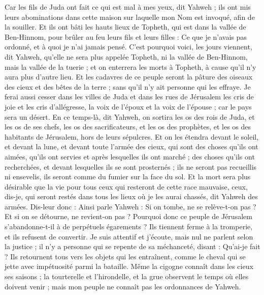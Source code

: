 \begin{multicols}{2}
Car les fils de Juda ont fait ce qui est mal à mes yeux, dit Yahweh ; ils ont mis leurs abominations dans cette maison sur laquelle mon Nom est invoqué, afin de la souiller.
Et ils ont bâti les hauts lieux de Topheth, qui est dans la vallée de Ben-Hinnom, pour brûler au feu leurs fils et leurs filles : Ce que je n'avais pas ordonné, et à quoi je n'ai jamais pensé.
C'est pourquoi voici, les jours viennent, dit Yahweh, qu'elle ne sera plus appelée Topheth, ni la vallée de Ben-Hinnom, mais la vallée de la tuerie ; et on enterrera les morts à Topheth, à cause qu'il n'y aura plus d'autre lieu.
Et les cadavres de ce peuple seront la pâture des oiseaux des cieux et des bêtes de la terre ; sans qu'il n'y ait personne qui les effraye.
Je ferai aussi cesser dans les villes de Juda et dans les rues de Jérusalem les cris de joie et les cris d'allégresse, la voix de l'époux et la voix de l'épouse ; car le pays sera un désert.
\VerseOne{}En ce temps-là, dit Yahweh, on sortira les os des rois de Juda, et les os de ses chefs, les os des sacrificateurs, et les os des prophètes, et les os des habitants de Jérusalem, hors de leurs sépulcres.
Et on les étendra devant le soleil, et devant la lune, et devant toute l'armée des cieux, qui sont des choses qu'ils ont aimées, qu'ils ont servies et après lesquelles ils ont marché ; des choses qu'ils ont recherchées, et devant lesquelles ils se sont prosternés ; ils ne seront pas recueillis ni ensevelis, ils seront comme du fumier sur la face du sol.
Et la mort sera plus désirable que la vie pour tous ceux qui resteront de cette race mauvaise, ceux, dis-je, qui seront restés dans tous les lieux où je les aurai chassés, dit Yahweh des armées.
Dis-leur donc : Ainsi parle Yahweh : Si on tombe, ne se relève-t-on pas ? Et si on se détourne, ne revient-on pas ?
Pourquoi donc ce peuple de Jérusalem s'abandonne-t-il à de perpétuels égarements ? Ils tiennent ferme à la tromperie, et ils refusent de convertir.
Je suis attentif et j'écoute, mais nul ne parlent selon la justice ; il n'y a personne qui se repente de sa méchanceté, disant : Qu'ai-je fait ? Ils retournent tous vers les objets qui les entraînent, comme le cheval qui se jette avec impétuosité parmi la bataille.
Même la cigogne connaît dans les cieux ses saisons ; la tourterelle et l'hirondelle, et la grue observent le temps où elles doivent venir ; mais mon peuple ne connaît pas les ordonnances de Yahweh.

\end{multicols}
